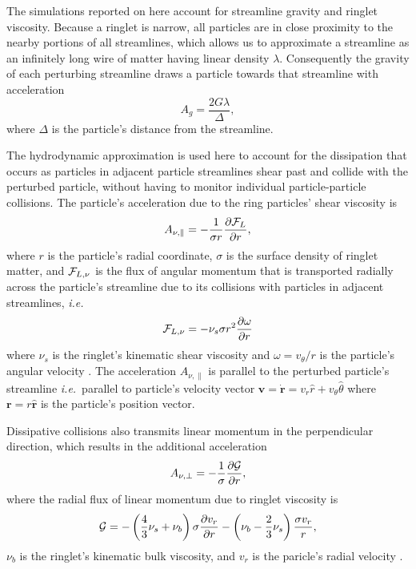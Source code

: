 \documentclass[preprint]{aastex62}
\begin{document}
The simulations reported on here account for streamline gravity
and ringlet viscosity. Because a ringlet is narrow, all particles
are in close proximity to the nearby portions of all streamlines,
which allows us to approximate a streamline as an infinitely
long wire of matter having linear density $\lambda$.
Consequently the gravity of each perturbing streamline draws a particle
towards that streamline with acceleration
\begin{equation}
\label{eqn:gravity}
    A_g=\frac{2G\lambda}{\Delta },
\end{equation}
where $\Delta$ is the particle's distance from the streamline.

The hydrodynamic approximation is used here to account for
the dissipation that occurs as particles in adjacent particle streamlines
shear past and collide with the perturbed particle,
without having to monitor individual particle-particle collisions.
The particle's acceleration due to the ring particles' shear viscosity is
\begin{equation}
\label{eqn:shear_viscosity}
    A_{\nu,\parallel}=-\frac{1}{\sigma r}\frac{\partial {\cal F}_L}{\partial r},
\end{equation}
where $r$ is the particle's radial coordinate, 
$\sigma$ is the surface density of ringlet matter, and 
${\cal F}_{L,\nu}$ is the flux of angular momentum
that is transported radially across the particle's streamline
due to its collisions with particles in adjacent streamlines, {\it i.e.}\
\begin{equation}
    \label{eqn:F_nu_theta}
    {\cal F}_{L,\nu} = -\nu_s \sigma r^2\frac{\partial\omega}{\partial r}
\end{equation}
where $\nu_s$ is the ringlet's kinematic shear viscosity
and $\omega=v_\theta/r$ is the particle's angular velocity \citep{HS13}.
The acceleration $A_{\nu,\parallel }$ is parallel to the perturbed particle's streamline
{\it i.e.}\ parallel to particle's velocity vector
$\mathbf{v}=\dot{\mathbf{r}}=v_r\hat{r} + v_\theta\hat{\theta}$ 
where $\mathbf{r} = r\hat{\mathbf{r}}$ is the particle's position vector.

Dissipative collisions also transmits linear momentum in the perpendicular direction,
which results in the additional acceleration
\begin{equation}
\label{eqn:bulk_viscosity}
    A_{\nu, \perp}=-\frac{1}{\sigma}\frac{\partial {\cal G}}{\partial r},
\end{equation}
where the radial flux of linear momentum due to ringlet viscosity is
\begin{equation}
    \label{eqn:G}
    {\cal G} = -\left(\frac{4}{3}\nu_s + \nu_b\right)\sigma\frac{\partial v_r}{\partial r}
        -\left(\nu_b - \frac{2}{3}\nu_s\right)\frac{\sigma v_r}{r},
\end{equation}
$\nu_b$ is the ringlet's kinematic bulk viscosity, and $v_r$ is the paricle's radial velocity
\citep{HS13}.
\end{document}

